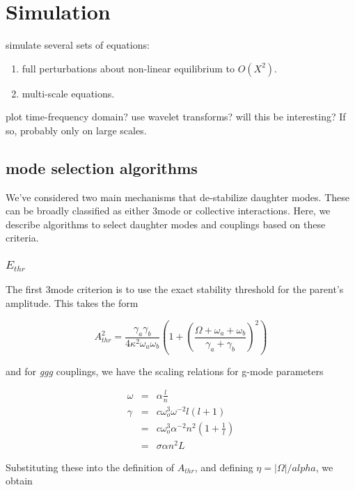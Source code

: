 \section*{Simulation}

simulate several sets of equations:
\begin{enumerate}
\item{full perturbations about non-linear equilibrium to $O(X^2)$.}
\item{multi-scale equations.}
\end{enumerate}

plot time-frequency domain? use wavelet transforms? will this be interesting? If so, probably only on large scales.

\subsection*{mode selection algorithms}

We've considered two main mechanisms that de-stabilize daughter modes. These can be broadly classified as either 3mode or collective interactions. Here, we describe algorithms to select daughter modes and couplings based on these criteria.

\subsubsection*{$E_{thr}$}

The first 3mode criterion is to use the exact stability threshold for the parent's amplitude. This takes the form 

\begin{equation}
A_{thr}^2 = \frac{\gamma_a \gamma_b}{4\kappa^2\omega_a\omega_b}\left(1+\left(\frac{\Omega+\omega_a+\omega_b}{\gamma_a+\gamma_b}\right)^2\right)
\end{equation}

and for \emph{ggg} couplings, we have the scaling relations for g-mode parameters

\begin{eqnarray}
\omega & = & \alpha\frac{l}{n} \\
\gamma & = & c \omega_o^3 \omega^{-2} l(l+1) \\
       & = & c \omega_o^3 \alpha^{-2} n^2 (1+\frac{1}{l}) \\
       & = & \sigma \alpha n^2 L
\end{eqnarray}

Substituting these into the definition of $A_{thr}$, and defining $\eta = |\Omega|/alpha$, we obtain

